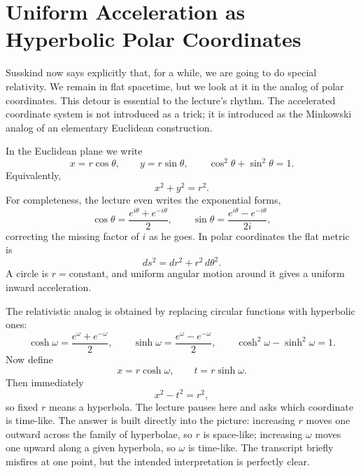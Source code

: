 \section{Uniform Acceleration as Hyperbolic Polar Coordinates}

Susskind now says explicitly that, for a while, we are going to do special relativity. We remain in flat spacetime, but we look at it in the analog of polar coordinates. This detour is essential to the lecture's rhythm. The accelerated coordinate system is not introduced as a trick; it is introduced as the Minkowski analog of an elementary Euclidean construction.

In the Euclidean plane we write
\begin{equation}
x=r\cos\theta,
\qquad
y=r\sin\theta,
\qquad
\cos^2\theta+\sin^2\theta=1.
\end{equation}
Equivalently,
\begin{equation}
x^2+y^2=r^2.
\end{equation}
For completeness, the lecture even writes the exponential forms,
\begin{equation}
\cos\theta=\frac{e^{i\theta}+e^{-i\theta}}{2},
\qquad
\sin\theta=\frac{e^{i\theta}-e^{-i\theta}}{2i},
\end{equation}
correcting the missing factor of \(i\) as he goes. In polar coordinates the flat metric is
\begin{equation}
ds^2=dr^2+r^2\,d\theta^2.
\end{equation}
A circle is \(r=\text{constant}\), and uniform angular motion around it gives a uniform inward acceleration.

The relativistic analog is obtained by replacing circular functions with hyperbolic ones:
\begin{equation}
\cosh\omega=\frac{e^\omega+e^{-\omega}}{2},
\qquad
\sinh\omega=\frac{e^\omega-e^{-\omega}}{2},
\qquad
\cosh^2\omega-\sinh^2\omega=1.
\end{equation}
Now define
\begin{equation}
x=r\cosh\omega,
\qquad
t=r\sinh\omega.
\end{equation}
Then immediately
\begin{equation}
x^2-t^2=r^2,
\end{equation}
so fixed \(r\) means a hyperbola. The lecture pauses here and asks which coordinate is time-like. The answer is built directly into the picture: increasing \(r\) moves one outward across the family of hyperbolae, so \(r\) is space-like; increasing \(\omega\) moves one upward along a given hyperbola, so \(\omega\) is time-like. The transcript briefly misfires at one point, but the intended interpretation is perfectly clear.

